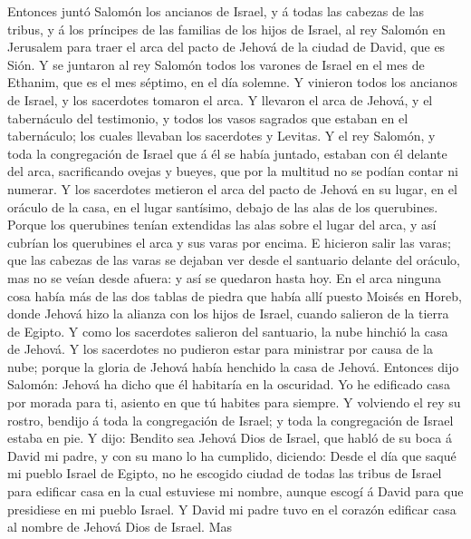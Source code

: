  Entonces juntó Salomón los ancianos de Israel, y á todas
las cabezas de las tribus, y á los príncipes de las familias de los
hijos de Israel, al rey Salomón en Jerusalem para traer el arca del
pacto de Jehová de la ciudad de David, que es Sión.  Y se
juntaron al rey Salomón todos los varones de Israel en el mes de
Ethanim, que es el mes séptimo, en el día solemne.  Y
vinieron todos los ancianos de Israel, y los sacerdotes tomaron el arca.
 Y llevaron el arca de Jehová, y el tabernáculo del
testimonio, y todos los vasos sagrados que estaban en el tabernáculo;
los cuales llevaban los sacerdotes y Levitas.  Y el rey
Salomón, y toda la congregación de Israel que á él se había juntado,
estaban con él delante del arca, sacrificando ovejas y bueyes, que por
la multitud no se podían contar ni numerar.  Y los
sacerdotes metieron el arca del pacto de Jehová en su lugar, en el
oráculo de la casa, en el lugar santísimo, debajo de las alas de los
querubines.  Porque los querubines tenían extendidas las
alas sobre el lugar del arca, y así cubrían los querubines el arca y sus
varas por encima.  E hicieron salir las varas; que las
cabezas de las varas se dejaban ver desde el santuario delante del
oráculo, mas no se veían desde afuera: y así se quedaron hasta hoy.
 En el arca ninguna cosa había más de las dos tablas de
piedra que había allí puesto Moisés en Horeb, donde Jehová hizo la
alianza con los hijos de Israel, cuando salieron de la tierra de Egipto.
 Y como los sacerdotes salieron del santuario, la nube
hinchió la casa de Jehová.  Y los sacerdotes no pudieron
estar para ministrar por causa de la nube; porque la gloria de Jehová
había henchido la casa de Jehová.  Entonces dijo Salomón:
Jehová ha dicho que él habitaría en la oscuridad.  Yo he
edificado casa por morada para ti, asiento en que tú habites para
siempre.  Y volviendo el rey su rostro, bendijo á toda la
congregación de Israel; y toda la congregación de Israel estaba en pie.
 Y dijo: Bendito sea Jehová Dios de Israel, que habló de su
boca á David mi padre, y con su mano lo ha cumplido, diciendo:
 Desde el día que saqué mi pueblo Israel de Egipto, no he
escogido ciudad de todas las tribus de Israel para edificar casa en la
cual estuviese mi nombre, aunque escogí á David para que presidiese en
mi pueblo Israel.  Y David mi padre tuvo en el corazón
edificar casa al nombre de Jehová Dios de Israel.  Mas

